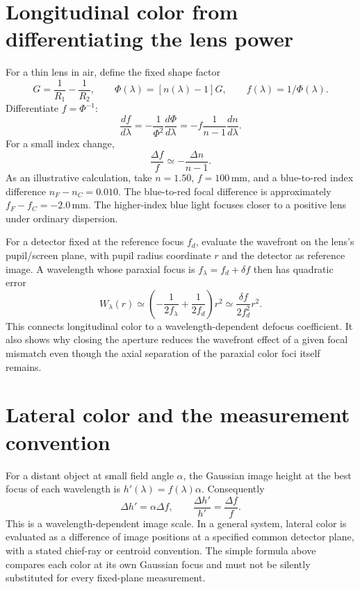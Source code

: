 \section{Longitudinal color from differentiating the lens power}
For a thin lens in air, define the fixed shape factor
\begin{equation}
 G=\frac1{R_1}-\frac1{R_2},\qquad
 \Phi(\lambda)=[n(\lambda)-1]G,\qquad f(\lambda)=1/\Phi(\lambda).
\end{equation}
Differentiate $f=\Phi^{-1}$:
\begin{equation}
 \frac{df}{d\lambda}=-\frac1{\Phi^2}\frac{d\Phi}{d\lambda}
   =-f\frac1{n-1}\frac{dn}{d\lambda}.
\end{equation}
For a small index change,
\begin{equation}
 \boxed{\frac{\Delta f}{f}\simeq-\frac{\Delta n}{n-1}.}
 \label{ab:chromaticfocus}
\end{equation}
As an illustrative calculation, take $n=1.50$, $f=100\,\mathrm{mm}$,
and a blue-to-red index difference $n_F-n_C=0.010$. The blue-to-red focal
difference is approximately $f_F-f_C=-2.0\,\mathrm{mm}$. The higher-index
blue light focuses closer to a positive lens under ordinary dispersion.

For a detector fixed at the reference focus $f_d$, evaluate the wavefront
on the lens's pupil/screen plane, with pupil radius coordinate $r$ and the
detector as reference image. A wavelength whose paraxial focus is
$f_\lambda=f_d+\delta f$ then has quadratic error
\begin{equation}
 W_\lambda(r)\simeq
     \left(-\frac{1}{2f_\lambda}+\frac{1}{2f_d}\right)r^2
     \simeq\frac{\delta f}{2f_d^2}r^2.
\end{equation}
This connects longitudinal color to a wavelength-dependent defocus
coefficient. It also shows why closing the aperture reduces the wavefront
effect of a given focal mismatch even though the axial separation of the
paraxial color foci itself remains.

\section{Lateral color and the measurement convention}
For a distant object at small field angle $\alpha$, the Gaussian image height
at the best focus of each wavelength is $h'(\lambda)=f(\lambda)\alpha$.
Consequently
\begin{equation}
 \Delta h'=\alpha\Delta f,
 \qquad \frac{\Delta h'}{h'}=\frac{\Delta f}{f}.
\end{equation}
This is a wavelength-dependent image scale. In a general system, lateral
color is evaluated as a difference of image positions at a specified common
detector plane, with a stated chief-ray or centroid convention. The simple
formula above compares each color at its own Gaussian focus and must not
be silently substituted for every fixed-plane measurement.

